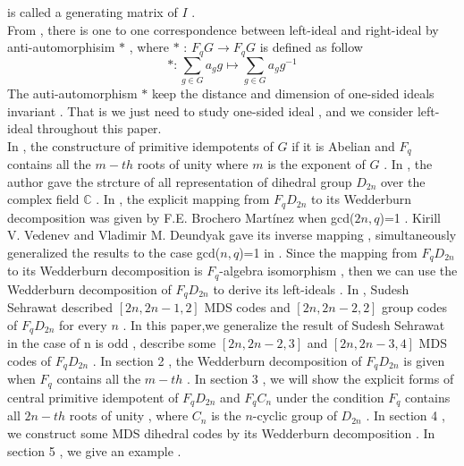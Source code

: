 \documentclass{article}
\begin{document}
is called a generating matrix of $I$ .\\
From \cite{bib16}\cite{bib12} , there is one to one correspondence between left-ideal and right-ideal by anti-automorphisim $\ast$ , where $\ast$ : $F_qG$$\rightarrow$$F_qG$ is defined as follow
\begin{equation*}
   \ast: {\sum_{g\in{G}}a_gg}\longmapsto{\sum_{g\in{G}}a_gg^{-1}}
\end{equation*}
The auti-automorphism $\ast$ keep the distance and dimension of one-sided ideals invariant . That is we just need to study one-sided ideal , and we consider left-ideal throughout this paper.\\
In \cite{bib4} , the constructure of primitive idempotents of $G$ if it is Abelian and $F_q$ contains all the $m-th$ roots of unity where $m$ is the exponent of $G$ . In \cite{bib17} , the author gave the strcture of all representation of dihedral group $D_{2n}$ over the complex field  $\mathbb{C}$ . In \cite{bib7} , the explicit mapping from $F_qD_{2n}$ to its Wedderburn decomposition was given by F.E. Brochero Martínez when gcd($2n,q$)=1 . Kirill V. Vedenev and  Vladimir M. Deundyak gave its inverse mapping , simultaneously generalized the results to the case gcd($n,q$)=1 in \cite{bib2} . Since the mapping from $F_qD_{2n}$
 to its Wedderburn decomposition is $F_q$-algebra isomorphism , then we can use the Wedderburn decomposition of $F_qD_{2n}$ to derive its left-ideals . In \cite{bib6}, Sudesh Sehrawat described $[2n,2n-1,2]$ MDS codes and $[2n,2n-2,2]$ group codes of $F_qD_{2n}$ for every $n$ . In this paper,we generalize the result of Sudesh Sehrawat in the case of n is odd , describe some $[2n,2n-2,3]$ and $[2n,2n-3,4]$ MDS codes of $F_qD_{2n}$ . In section 2 , the Wedderburn decomposition of $F_qD_{2n}$ is given when $F_q$ contains all the $m-th$ . In section 3 , we will show the explicit forms of central primitive idempotent of $F_qD_{2n}$ and $F_qC_{n}$ under the condition $F_q$ contains all $2n-th$ roots of unity , where $C_{n}$ is the $n$-cyclic group of $D_{2n}$ . In section 4 , we construct some MDS dihedral codes by its Wedderburn decomposition . In section 5 , we give an example .
\end{document}
